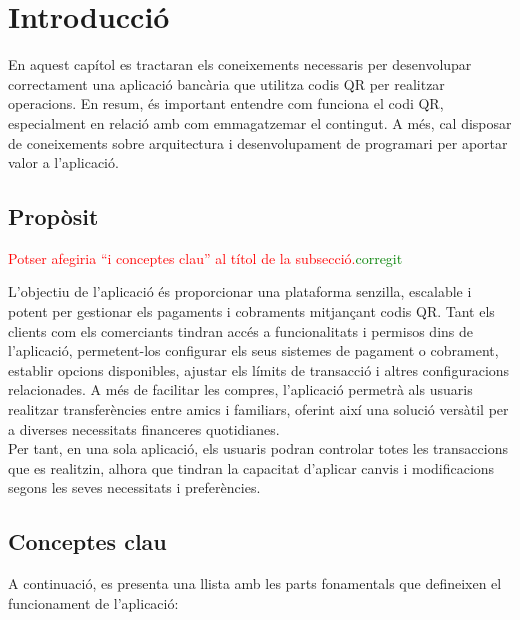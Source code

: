 \documentclass[a4paper,12pt,twoside]{ThesisStyle}
\newcommand{\pau}[1]{\textcolor{red}{#1}}
\newcommand{\sudan}[1]{\textcolor{green}{#1}}
\begin{document}
\section{Introducció}
\label{subsec:Introducció}

En aquest capítol es tractaran els coneixements necessaris per desenvolupar correctament una aplicació bancària que utilitza codis QR per realitzar operacions. En resum, és important entendre com funciona el codi QR, especialment en relació amb com emmagatzemar el contingut. A més, cal disposar de coneixements sobre arquitectura i desenvolupament de programari per aportar valor a l'aplicació.

\subsection{Propòsit}
\label{subsec: Propòsit}

\pau{Potser afegiria ``i conceptes clau'' al títol de la subsecció.}\sudan{corregit}

L'objectiu de l'aplicació és proporcionar una plataforma senzilla, escalable i potent per gestionar els pagaments i cobraments mitjançant codis QR. Tant els clients com els comerciants tindran accés a funcionalitats i permisos dins de l'aplicació, permetent-los configurar els seus sistemes de pagament o cobrament, establir opcions disponibles, ajustar els límits de transacció i altres configuracions relacionades. A més de facilitar les compres, l'aplicació permetrà als usuaris realitzar transferències entre amics i familiars, oferint així una solució versàtil per a diverses necessitats financeres quotidianes.\\

Per tant, en una sola aplicació, els usuaris podran controlar totes les transaccions que es realitzin, alhora que tindran la capacitat d'aplicar canvis i modificacions segons les seves necessitats i preferències.\\


\subsection{Conceptes clau}
\label{subsec: Conceptes clau}

A continuació, es presenta una llista amb les parts fonamentals que defineixen el funcionament de l'aplicació:
\end{document}
